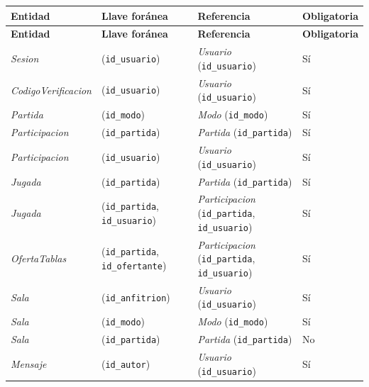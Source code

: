 \begin{center}\small
\begin{longtable}{|L{0.21\textwidth}|L{0.26\textwidth}|L{0.29\textwidth}|L{0.12\textwidth}|}
\hline
\textbf{Entidad} & \textbf{Llave foránea} & \textbf{Referencia} & \textbf{Obligatoria} \\ \hline
\endfirsthead
\hline
\textbf{Entidad} & \textbf{Llave foránea} & \textbf{Referencia} & \textbf{Obligatoria} \\ \hline
\endhead
\textit{Sesion} & (\texttt{id\_\allowbreak{}usuario}) & \textit{Usuario} (\texttt{id\_\allowbreak{}usuario}) & Sí \\ \hline
\textit{Codigo\-Verificacion} & (\texttt{id\_\allowbreak{}usuario}) & \textit{Usuario} (\texttt{id\_\allowbreak{}usuario}) & Sí \\ \hline
\textit{Partida} & (\texttt{id\_\allowbreak{}modo}) & \textit{Modo} (\texttt{id\_\allowbreak{}modo}) & Sí \\ \hline
\textit{Participacion} & (\texttt{id\_\allowbreak{}partida}) & \textit{Partida} (\texttt{id\_\allowbreak{}partida}) & Sí \\ \hline
\textit{Participacion} & (\texttt{id\_\allowbreak{}usuario}) & \textit{Usuario} (\texttt{id\_\allowbreak{}usuario}) & Sí \\ \hline
\textit{Jugada} & (\texttt{id\_\allowbreak{}partida}) & \textit{Partida} (\texttt{id\_\allowbreak{}partida}) & Sí \\ \hline
\textit{Jugada} & (\texttt{id\_\allowbreak{}partida}, \texttt{id\_\allowbreak{}usuario}) & \textit{Participacion} (\texttt{id\_\allowbreak{}partida}, \texttt{id\_\allowbreak{}usuario}) & Sí \\ \hline
\textit{Oferta\-Tablas} & (\texttt{id\_\allowbreak{}partida}, \texttt{id\_\allowbreak{}ofertante}) & \textit{Participacion} (\texttt{id\_\allowbreak{}partida}, \texttt{id\_\allowbreak{}usuario}) & Sí \\ \hline
\textit{Sala} & (\texttt{id\_\allowbreak{}anfitrion}) & \textit{Usuario} (\texttt{id\_\allowbreak{}usuario}) & Sí \\ \hline
\textit{Sala} & (\texttt{id\_\allowbreak{}modo}) & \textit{Modo} (\texttt{id\_\allowbreak{}modo}) & Sí \\ \hline
\textit{Sala} & (\texttt{id\_\allowbreak{}partida}) & \textit{Partida} (\texttt{id\_\allowbreak{}partida}) & No \\ \hline
\textit{Mensaje} & (\texttt{id\_\allowbreak{}autor}) & \textit{Usuario} (\texttt{id\_\allowbreak{}usuario}) & Sí \\ \hline

\end{longtable}
\end{center}
